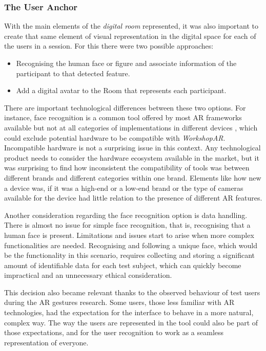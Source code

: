 \subsubsection{The User Anchor \label{sec:5-2-1-2}}

With the main elements of the \emph{digital room} represented, it was also important to create that same element of visual representation in the digital space for each of
the users in a session. For this there were two possible approaches:

\begin{itemize}
    \item Recognising the human face or figure and associate information of the participant to that detected feature.
    \item Add a digital avatar to the Room that represents each participant.
\end{itemize}

There are important technological differences between these two options. For instance, face recognition is a common tool offered by most \ac{AR} frameworks available but
not at all categories of implementations in different devices \parencite{arcore_2025}, which could exclude potential hardware to be compatible with \emph{WorkshopAR}.
Incompatible hardware is not a surprising issue in this context. Any technological product needs to consider the hardware ecosystem available in the market, but it was
surprising to find how inconsistent the compatibility of tools was between different brands and different categories within one brand. Elements like how new a device was,
if it was a high-end or a low-end brand or the type of cameras available for the device had little relation to the presence of different \ac{AR} features.

Another consideration regarding the face recognition option is data handling. There is almost no issue for simple face recognition, that is, recognising that a human face
is present. Limitations and issues start to arise when more complex functionalities are needed. Recognising and following a unique face, which would be the functionality
in this scenario, requires collecting and storing a significant amount of identifiable data for each test subject, which can quickly become impractical and an unnecessary
ethical consideration.

This decision also became relevant thanks to the observed behaviour of test users during the \ac{AR} gestures research. Some users, those less familiar with \ac{AR}
technologies, had the expectation for the interface to behave in a more natural, complex way. The way the users are represented in the tool could also be part of those
expectations, and for the user recognition to work as a seamless representation of everyone.

